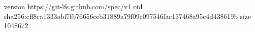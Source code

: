 version https://git-lfs.github.com/spec/v1
oid sha256:cff8ca1333abf7fb76656ceb31889a79f09e097546fac137468a95c4d438619b
size 1048672

